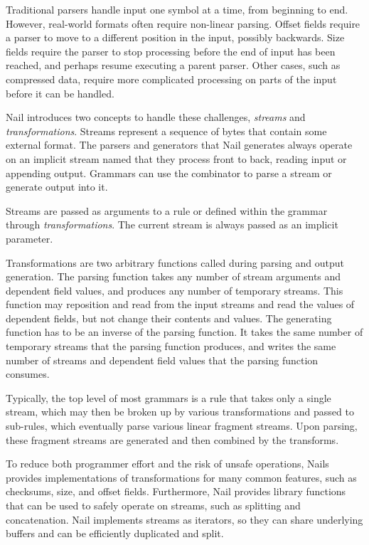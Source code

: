 Traditional parsers handle input one symbol at a time, from beginning to end.
However, real-world formats often require non-linear parsing. Offset fields require a parser to move
to a different position in the input, possibly backwards. Size fields require the parser to stop
processing before the end of input has been reached, and perhaps resume executing a parent parser.
Other cases, such as compressed data, require more complicated processing on parts of the input
before it can be handled.

Nail introduces two concepts to handle these challenges, \emph{streams} and \emph{transformations}. 
Streams represent a sequence of bytes that contain some external format. The parsers and generators
that Nail generates always operate on an implicit stream named  that they process front to
back, reading input or appending output.
Grammars can use the  combinator to parse a stream or generate output into it. 

Streams are passed as arguments to a rule or defined within the grammar through \emph{transformations}.
The current stream is always passed as an implicit parameter.

Transformations are two arbitrary functions called during parsing and output generation.
The parsing function  takes any number of stream arguments and dependent field values,
and produces any number of temporary streams. This function may reposition and read from the
input streams and read the values of dependent fields, but not change their contents and values. 
The generating function has to be an inverse of the parsing function. It takes the same number of
temporary streams that the parsing function produces, and writes the same number of streams and
dependent field values that the parsing function consumes.

Typically, the top level of most grammars is a rule that takes only a single stream, which may then
be broken up by various transformations and passed to sub-rules, which eventually parse various linear
fragment streams. Upon parsing, these fragment streams are generated and then combined by the
transforms.

 To reduce both programmer effort and the risk of unsafe operations, Nails provides implementations of
transformations for many common features, such as checksums, size, and offset fields. Furthermore,
Nail provides library functions that can be used to safely operate on streams, such as splitting and
concatenation. Nail implements streams as iterators, so they can share underlying buffers and can be
efficiently duplicated and split.


